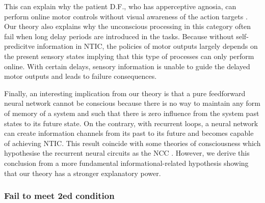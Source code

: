 \documentclass[utf8]{article}
\newcommand{\needref}[1]{%
			\ifthenelse{\equal{#1}{}}{%
				\todo[color=White, linecolor=Orange, bordercolor=Orange]{\textcolor{Orange}{Ref}}}{%
				\todo[color=White, linecolor=Orange, bordercolor=Orange]{\textcolor{Orange}{Ref: #1}}%
			}%
		}
\newcommand{\rlend}{\cbend}
\begin{document}
    		This can explain why the patient D.F., who has apperceptive agnosia, can perform online motor controls without visual awareness of the action targets  \citep{10.3389/fneur.2014.00255}.
    		Our theory also explains why the unconscious processing in this category often fail when long delay periods are introduced in the tasks. Because without self-predicitve information in NTIC, the policies of motor outputs largely depends on the present sensory states implying that this type of processes can only perform online. With certain delays, sensory information is unable to guide the delayed motor outputs and leads to failure consequences. 
    		
    		Finally, an interesting implication from our theory is that a pure feedforward neural network cannot be conscious because there is no way to maintain any form of memory of a system and such that there is zero influence from the system past states to its future state. On the contrary, with recurrent loops, a neural network can create information channels from its past to its future and becomes capable of achieving NTIC. This result coincide with some theories of consciousness which hypothesise the recurrent neural circuits as the NCC \needref{recurrent and NCC}. However, we derive this conclusion from a more fundamental informational-related hypothesis showing that our theory has a stronger explanatory power. 
\rlend


        \subsubsection{Fail to meet 2\lowercase{ed} condition}
\end{document}
